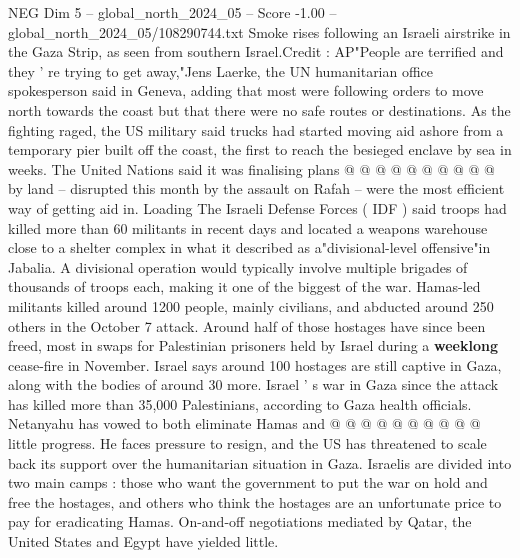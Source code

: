 \begin{textsample}{NEG Dim 5 – global\_north\_2024\_05 – Score -1.00 – global\_north\_2024\_05/108290744.txt}
Smoke rises following an Israeli airstrike in the Gaza Strip, as seen from southern Israel.Credit : AP"People are terrified and they ' re trying to get away,"Jens Laerke, the UN humanitarian office spokesperson said in Geneva, adding that most were following orders to move north towards the coast but that there were no safe routes or destinations.
As the fighting raged, the US military said trucks had started moving aid ashore from a temporary pier built off the coast, the first to reach the besieged enclave by sea in weeks.
The United Nations said it was finalising plans @ @ @ @ @ @ @ @ @ @ by land -- disrupted this month by the assault on Rafah -- were the most efficient way of getting aid in.
Loading The Israeli Defense Forces ( IDF ) said troops had killed more than 60 militants in recent days and located a weapons warehouse close to a shelter complex in what it described as a"divisional-level offensive"in Jabalia.
A divisional operation would typically involve multiple brigades of thousands of troops each, making it one of the biggest of the war.
Hamas-led militants killed around 1200 people, mainly civilians, and abducted around 250 others in the October 7 attack.
Around half of those hostages have since been freed, most in swaps for Palestinian prisoners held by Israel during a \textbf{weeklong} cease-fire in November.
Israel says around 100 hostages are still captive in Gaza, along with the bodies of around 30 more.
Israel ' s war in Gaza since the attack has killed more than 35,000 Palestinians, according to Gaza health officials.
Netanyahu has vowed to both eliminate Hamas and @ @ @ @ @ @ @ @ @ @ little progress.
He faces pressure to resign, and the US has threatened to scale back its support over the humanitarian situation in Gaza.
Israelis are divided into two main camps : those who want the government to put the war on hold and free the hostages, and others who think the hostages are an unfortunate price to pay for eradicating Hamas.
On-and-off negotiations mediated by Qatar, the United States and Egypt have yielded little.

\end{textsample}
